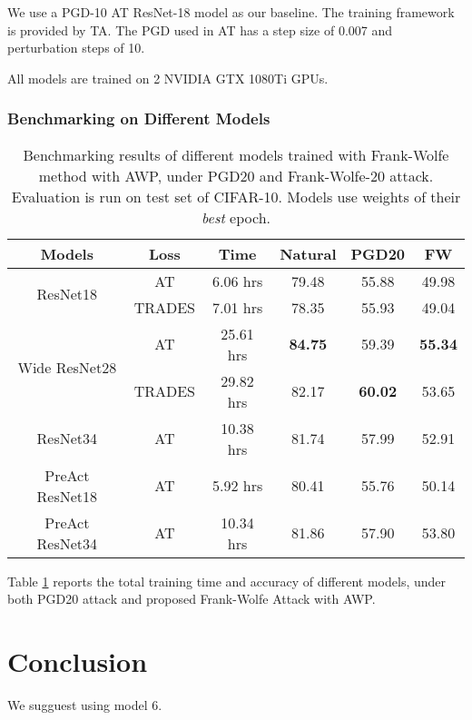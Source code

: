 \documentclass{article}
\begin{document}
            We use a PGD-10 AT ResNet-18 model as our baseline. The training framework is provided by TA. The PGD used in AT has a step size of 0.007 and perturbation steps of 10. 

            All models are trained on 2 NVIDIA GTX 1080Ti GPUs.

        \subsubsection{Benchmarking on Different Models}\label{subs:DefenseModelBenchmarking}
            \begin{table}[h]
                \centering
                \begin{tabular}{cccccc}
                    \hline
                    Models                         & Loss   & Time      & Natural & PGD20 &  FW  \\ \hline
                    \multirow{2}{*}{ResNet18}      & AT     & 6.06 hrs  & 79.48 & 55.88 & 49.98 \\
                                                   & TRADES & 7.01 hrs  & 78.35 & 55.93 & 49.04 \\ \hline
                    \multirow{2}{*}{Wide ResNet28} & AT     & 25.61 hrs & \textbf{84.75} & 59.39 & \textbf{55.34} \\
                                                   & TRADES & 29.82 hrs & 82.17 & \textbf{60.02} & 53.65 \\ \hline
                    ResNet34                       & AT     & 10.38 hrs & 81.74 & 57.99 & 52.91 \\ \hline
                    PreAct ResNet18                & AT     & 5.92 hrs  & 80.41 & 55.76 & 50.14 \\ \hline
                    PreAct ResNet34                & AT     & 10.34 hrs & 81.86 & 57.90 & 53.80 \\ \hline
                \end{tabular}
                \caption{Benchmarking results of different models trained with Frank-Wolfe method with AWP, under PGD20 and Frank-Wolfe-20 attack. Evaluation is run on test set of CIFAR-10. Models use weights of their \emph{best} epoch.}
                \label{table:DefenseBenchmarkingResults}
            \end{table}
            Table \ref{table:DefenseBenchmarkingResults} reports the total training time and accuracy of different models, under both PGD20 attack and proposed Frank-Wolfe Attack with AWP.



\section{Conclusion}\label{sec:Conclusion}
We sugguest using model 6.
\end{document}
